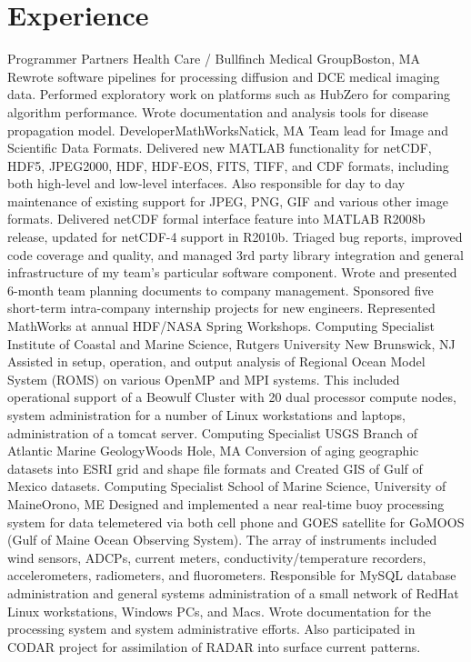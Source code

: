 \documentclass[11pt,a4paper,sans]{moderncv}
\begin{document}
\section{Experience}
    {Programmer}
    {Partners Health Care / Bullfinch Medical Group}{Boston, MA}{}{
      Rewrote software pipelines for processing diffusion and DCE medical
      imaging data.  Performed exploratory work on platforms such as
      HubZero  for comparing algorithm performance. Wrote documentation
      and analysis tools for disease propagation model.}
    {Developer}{MathWorks}{Natick, MA}{}
        {Team lead for Image and Scientific Data Formats.  Delivered new
        MATLAB functionality for netCDF, HDF5, JPEG2000, HDF, HDF-EOS,
        FITS, TIFF, and CDF formats, including both high-level and
        low-level interfaces.  Also responsible for day to day maintenance
        of existing support for JPEG, PNG, GIF and various other image
        formats.  Delivered netCDF formal interface feature into MATLAB
        R2008b release, updated for netCDF-4 support in R2010b. Triaged
        bug reports, improved code coverage and quality, and managed
        3rd party library integration and general infrastructure of my
        team's particular software component.  Wrote and presented 6-month
        team planning documents to company management.  Sponsored five
        short-term intra-company internship projects for new engineers.
        Represented MathWorks at annual HDF/NASA Spring Workshops.}
    {Computing Specialist}
    {Institute of Coastal and Marine Science, Rutgers University}
    {New Brunswick, NJ}{}
      {Assisted in setup,  operation, and output analysis  of Regional
      Ocean Model System (ROMS) on various OpenMP and MPI systems.
      This included operational support of a Beowulf Cluster with 20
      dual processor compute nodes, system administration for a number of
      Linux workstations and laptops, administration of a tomcat server.}
    {Computing Specialist}
    {USGS Branch of Atlantic Marine Geology}{Woods Hole, MA}{}
      {Conversion of aging geographic datasets into ESRI grid and
      shape file formats and Created GIS of Gulf of Mexico datasets.}
    {Computing Specialist}
    {School of Marine Science, University of Maine}{Orono, ME}{}
        {Designed and implemented a near real-time buoy processing system
        for data telemetered via both cell phone and GOES satellite
        for GoMOOS (Gulf of Maine Ocean Observing System).   The array
        of instruments included wind sensors, ADCPs, current meters,
        conductivity/temperature recorders, accelerometers, radiometers,
        and fluorometers.   Responsible for MySQL database administration
        and general systems administration of a small network of RedHat
        Linux workstations, Windows PCs, and Macs.   Wrote documentation
        for the processing system and system administrative efforts.
        Also participated in CODAR project for assimilation of RADAR
        into surface current patterns.}
\end{document}
